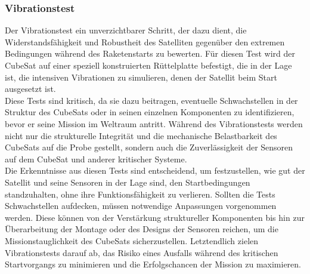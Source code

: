 \subsubsection{Vibrationstest}
Der Vibrationstest ein unverzichtbarer Schritt, der dazu dient, die Widerstandsfähigkeit und Robustheit des Satelliten gegenüber den extremen Bedingungen während des Raketenstarts zu bewerten. Für diesen Test wird der CubeSat auf einer speziell konstruierten Rüttelplatte befestigt, die in der Lage ist, die intensiven Vibrationen zu simulieren, denen der Satellit beim Start ausgesetzt ist.\\
\vspace{2mm}
Diese Tests sind kritisch, da sie dazu beitragen, eventuelle Schwachstellen in der Struktur des CubeSats oder in seinen einzelnen Komponenten zu identifizieren, bevor er seine Mission im Weltraum antritt. Während des Vibrationstests werden nicht nur die strukturelle Integrität und die mechanische Belastbarkeit des CubeSats auf die Probe gestellt, sondern auch die Zuverlässigkeit der Sensoren auf dem CubeSat und anderer kritischer Systeme. \\
\vspace{2mm}
Die Erkenntnisse aus diesen Tests sind entscheidend, um festzustellen, wie gut der Satellit und seine Sensoren in der Lage sind, den Startbedingungen standzuhalten, ohne ihre Funktionsfähigkeit zu verlieren. Sollten die Tests Schwachstellen aufdecken, müssen notwendige Anpassungen vorgenommen werden. Diese können von der Verstärkung struktureller Komponenten bis hin zur Überarbeitung der Montage oder des Designs der Sensoren reichen, um die Missionstauglichkeit des CubeSats sicherzustellen. Letztendlich zielen Vibrationstests darauf ab, das Risiko eines Ausfalls während des kritischen Startvorgangs zu minimieren und die Erfolgschancen der Mission zu maximieren.


